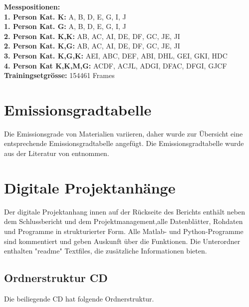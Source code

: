 \textbf{Messpositionen:}\\
\textbf{1. Person Kat. K:} A, B, D, E, G, I, J\\
\textbf{1. Person Kat. G:} A, B, D, E, G, I, J\\
\textbf{2. Person Kat. K,K:} AB, AC, AI, DE, DF, GC, JE, JI   \\
\textbf{2. Person Kat. K,G:} AB, AC, AI, DE, DF, GC, JE, JI   \\
\textbf{3. Person Kat. K,G,K:} AEI, ABC, DEF, ABI, DHL, GEI, GKI, HDC \\
\textbf{4. Person Kat K,K,M,G:} ACDF, ACJL, ADGI, DFAC, DFGI, GJCF \\
\textbf{Trainingsetgrösse:}         154461 Frames \\			
			
		\chapter{Emissionsgradtabelle}
			\label{AnhangE}
			
			Die Emissionsgrade von Materialien variieren, daher wurde zur Übersicht eine entsprechende Emissionsgradtabelle angefügt. Die Emissionsgradtabelle wurde aus der Literatur von \cite{Thermoformeln} entnommen.
			
			
			
			
			
			\chapter{Digitale Projektanhänge}
			\label{AnhangDig}
			
			Der digitale Projektanhang innen auf der Rückseite des Berichts enthält neben dem Schlussbericht und dem Projektmanagement,alle Datenblätter, Rohdaten und Programme in strukturierter Form. Alle Matlab- und Python-Programme sind kommentiert und geben Auskunft über die Funktionen. Die Unterordner enthalten "readme" Textfiles, die zusätzliche Informationen bieten.
			
			\section{Ordnerstruktur CD}
			
			
			Die beiliegende CD hat folgende Ordnerstruktur.
			
